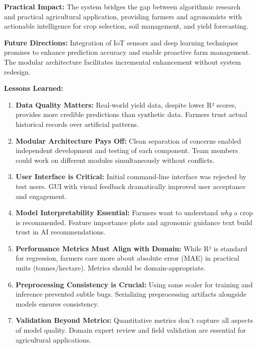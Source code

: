 \documentclass[conference]{IEEEtran}
\begin{document}
\textbf{Practical Impact:}
The system bridges the gap between algorithmic research and practical agricultural application, providing farmers and agronomists with actionable intelligence for crop selection, soil management, and yield forecasting.

\textbf{Future Directions:}
Integration of IoT sensors and deep learning techniques promises to enhance prediction accuracy and enable proactive farm management. The modular architecture facilitates incremental enhancement without system redesign.

\textbf{Lessons Learned:}
\begin{enumerate}
    \item \textbf{Data Quality Matters:} Real-world yield data, despite lower R² scores, provides more credible predictions than synthetic data. Farmers trust actual historical records over artificial patterns.
    
    \item \textbf{Modular Architecture Pays Off:} Clean separation of concerns enabled independent development and testing of each component. Team members could work on different modules simultaneously without conflicts.
    
    \item \textbf{User Interface is Critical:} Initial command-line interface was rejected by test users. GUI with visual feedback dramatically improved user acceptance and engagement.
    
    \item \textbf{Model Interpretability Essential:} Farmers want to understand \textit{why} a crop is recommended. Feature importance plots and agronomic guidance text build trust in AI recommendations.
    
    \item \textbf{Performance Metrics Must Align with Domain:} While R² is standard for regression, farmers care more about absolute error (MAE) in practical units (tonnes/hectare). Metrics should be domain-appropriate.
    
    \item \textbf{Preprocessing Consistency is Crucial:} Using same scaler for training and inference prevented subtle bugs. Serializing preprocessing artifacts alongside models ensures consistency.
    
    \item \textbf{Validation Beyond Metrics:} Quantitative metrics don't capture all aspects of model quality. Domain expert review and field validation are essential for agricultural applications.
\end{enumerate}
\end{document}
